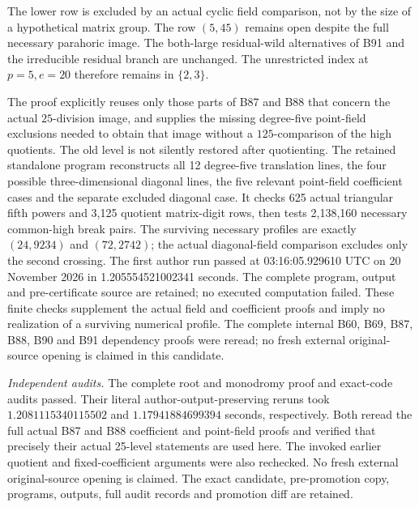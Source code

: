 \begin{remark}
\label{rem:B-RD92-scope}
The lower row is excluded by an actual cyclic field comparison,
not by the size of a hypothetical matrix group. The row \((5,45)\)
remains open despite the full necessary parahoric image. The
both-large residual-wild alternatives of B91 and the irreducible
residual branch are unchanged. The unrestricted index at
\(p=5,e=20\) therefore remains in \(\{2,3\}\).

The proof explicitly reuses only those parts of B87 and B88 that
concern the actual \(25\)-division image, and supplies the missing
degree-five point-field exclusions needed to obtain that image
without a \(125\)-comparison of the high quotients. The old level
is not silently restored after quotienting. The retained standalone
program 
reconstructs all 12 degree-five translation lines, the four possible
three-dimensional diagonal lines, the five relevant point-field
coefficient cases and the separate excluded diagonal case. It checks
625 actual triangular fifth powers and 3,125 quotient matrix-digit
rows, then tests 2,138,160 necessary common-high break pairs. The
surviving necessary profiles are exactly \((24,9234)\) and
\((72,2742)\); the actual diagonal-field comparison excludes only
the second crossing. The first author run passed at
03:16:05.929610 UTC on 20 November 2026 in
1.205554521002341 seconds. The complete program, output and
pre-certificate source are retained; no executed computation failed.
These finite checks supplement the actual field and coefficient
proofs and imply no realization of a surviving numerical profile.
The complete internal B60, B69, B87, B88, B90 and B91 dependency
proofs were reread; no fresh external original-source opening is
claimed in this candidate.

\smallskip
\noindent\emph{Independent audits.}
The complete root and monodromy proof and exact-code audits passed.
Their literal author-output-preserving reruns took
\(1.2081115340115502\) and
\(1.17941884699394\) seconds, respectively.
Both reread the full actual B87 and B88 coefficient and point-field
proofs and verified that precisely their actual 25-level statements
are used here. The invoked earlier quotient and fixed-coefficient
arguments were also rechecked. No fresh external original-source
opening is claimed. The exact candidate, pre-promotion copy,
programs, outputs, full audit records and promotion diff are retained.
\end{remark}

